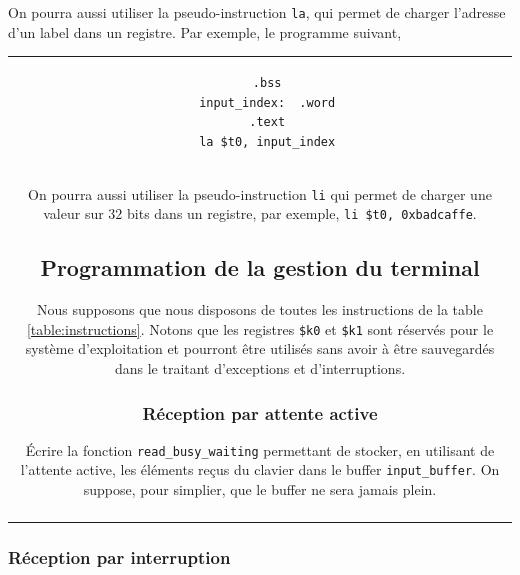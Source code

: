 \documentclass[12pt]{article}
\begin{document}
On pourra aussi utiliser la pseudo-instruction \verb+la+, qui permet de charger l'adresse d'un label dans un registre. Par exemple, le programme suivant,\\
\begin{tabular}{c}
\begin{lstlisting}
  .bss
  input_index:  .word
  .text
  la $t0, input_index

\end{lstlisting}
\end{tabular}

mettra l'adresse du label \verb+input_index+ dans le registre \verb+$t0+.\\

On pourra aussi utiliser la pseudo-instruction \verb+li+ qui permet de charger une valeur sur $32$ bits dans un registre, par exemple,
\lstinline+li $t0, 0xbadcaffe+.


\subsection{Programmation de la gestion du terminal}

Nous supposons que nous disposons de toutes les instructions de la table \ref{table:instructions}. Notons que les registres \verb+$k0+ et \verb+$k1+
sont réservés pour le système d'exploitation et pourront être utilisés sans avoir à être sauvegardés dans le traitant d'exceptions et d'interruptions.

\subsubsection{Réception par attente active}

\'Ecrire la fonction \verb+read_busy_waiting+ permettant de stocker, en utilisant de l'attente active, les éléments reçus du clavier dans le buffer
\verb+input_buffer+. On suppose, pour simplier, que le buffer ne sera jamais plein.\\

\lstset{language=[mips]Assembler}

\begin{tabular}{c}
\begin{lstlisting}
  .kdata
input_index:  .word 0
input_buffer: .space BIG

  .ktext
read_busy_waiting:
  # to do
\end{lstlisting}
\end{tabular}

\subsubsection{Réception par interruption}
\end{document}
